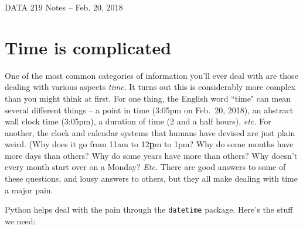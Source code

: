 \documentclass[12pt]{article}
\begin{document}
\begin{center}
\begin{Large}
DATA 219 Notes -- Feb. 20, 2018
\end{Large}
\end{center}

\section{Time is complicated}

One of the most common categories of information you'll ever deal with are
those dealing with various aspects \textit{time}. It turns out this is
considerably more complex than you might think at first. For one thing, the
English word ``time" can mean several different things -- a point in time
(3:05pm on Feb.~20, 2018), an abstract wall clock time (3:05pm), a duration of
time (2 and a half hours), \textit{etc.} For another, the clock and calendar
systems that humans have devised are just plain weird. (Why does it go from
11am to 12\underline{\textbf{p}}m to 1pm? Why do some months have more days
than others? Why do some years have more than others? Why doesn't every month
start over on a Monday? \textit{Etc.} There are good answers to some of these
questions, and lousy answers to others, but they all make dealing with time a
major pain.

Python helps deal with the pain through the \texttt{datetime} package. Here's
the stuff we need:
\end{document}
